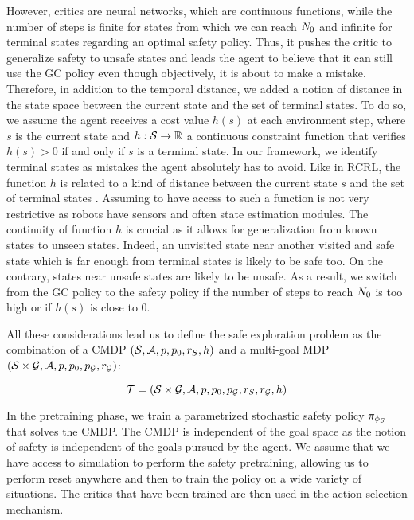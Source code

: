 However, critics are neural networks, which are continuous functions, while the number of steps is finite for states from which we can reach $N_0$ and infinite for terminal states regarding an optimal safety policy. Thus, it pushes the critic to generalize safety to unsafe states and leads the agent to believe that it can still use the GC policy even though objectively, it is about to make a mistake. Therefore, in addition to the temporal distance, we added a notion of distance in the state space between the current state and the set of terminal states. To do so, we assume the agent receives a cost value $h(s)$ at each environment step, where $s$ is the current state and $h: \mathcal{S} \to \mathbb{R}$ a continuous constraint function that verifies $h(s) > 0$ if and only if $s$ is a terminal state. In our framework, we identify terminal states as mistakes the agent absolutely has to avoid. Like in RCRL, the function $h$ is related to a kind of distance between the current state $s$ and the set of terminal states \cite{RCRL2022}. Assuming to have access to such a function is not very restrictive as robots have sensors and often state estimation modules. The continuity of function $h$ is crucial as it allows for generalization from known states to unseen states. Indeed, an unvisited state near another visited and safe state which is far enough from terminal states is likely to be safe too. On the contrary, states near unsafe states are likely to be unsafe. As a result, we switch from the GC policy to the safety policy if the number of steps to reach $N_0$ is too high or if $h(s)$ is close to $0$. 

All these considerations lead us to define the safe exploration problem as the combination of a CMDP $(\mathcal{S}, \mathcal{A}, p, p_0, r_S, h)$
and a multi-goal MDP $(\mathcal{S} \times \mathcal{G}, \mathcal{A}, p, p_0, p_{\mathcal{G}}, r_{\mathcal{G}})$:

\begin{equation}
    \mathcal{T} = (\mathcal{S} \times \mathcal{G}, \mathcal{A}, p, p_0, p_{\mathcal{G}}, r_S, r_{\mathcal{G}}, h)
    \label{eq:SafeExpProblem}
\end{equation}

In the pretraining phase, we train a parametrized stochastic safety policy $\pi_{\phi_S}$ that solves the CMDP. 
The CMDP is independent of the goal space as the notion of safety is independent of the goals pursued by the agent.
We assume that we have access to simulation to perform the safety pretraining, allowing us to perform reset anywhere 
and then to train the policy on a wide variety of situations. The critics that have been trained are then used in the 
action selection mechanism.

